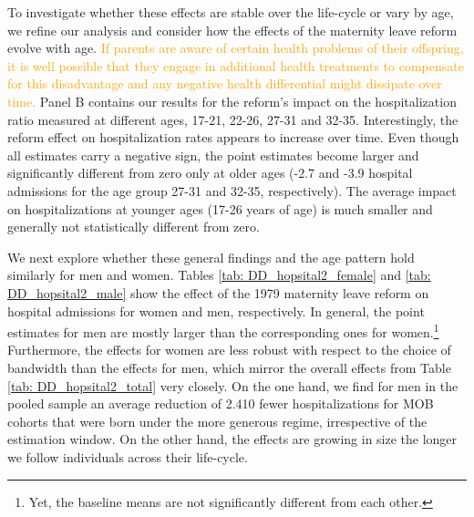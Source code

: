 \documentclass[11pt, a4paper]{article} %
\newcommand\natalia[1]{\textcolor{orange}{#1}}
\begin{document}
To investigate whether these effects are stable over the life-cycle or vary by age, we refine our analysis and consider how the effects of the maternity leave reform evolve with age.  \natalia{If parents are aware of certain health problems of their offspring, it is well possible that they engage in additional health treatments to compensate for this disadvantage and any negative health differential might dissipate over time.} Panel B contains our results for the reform's impact on the hospitalization ratio measured at different ages, 17-21, 22-26, 27-31 and 32-35. Interestingly, the reform effect on hospitalization rates appears to increase over time. Even though all estimates  carry a negative sign, the point estimates become larger and significantly different from zero only at older ages (-2.7 and -3.9 hospital admissions for the age group 27-31 and 32-35, respectively). The average impact on hospitalizations at younger ages (17-26 years of age) is much smaller and generally not statistically different from zero.\newline


 
We next explore whether these general findings and the age pattern hold similarly for men and women. Tables \ref{tab: DD_hopsital2_female} and \ref{tab: DD_hopsital2_male} show the effect of the 1979 maternity leave reform on hospital admissions for women and men, respectively. In general, the point estimates for men are mostly larger than the corresponding ones for women.\footnote{Yet, the baseline means are not significantly different from each other.} Furthermore, the effects for women are less robust with respect to the choice of bandwidth than the effects for men, which mirror the overall effects from Table \ref{tab: DD_hopsital2_total} very closely. On the one hand, we find for men in the pooled sample an average reduction of 2.410 fewer hospitalizations for MOB cohorts that were born under the more generous regime, irrespective of the estimation window. On the other hand, the effects are growing in size the longer we follow individuals across their life-cycle. \newline
\end{document}
